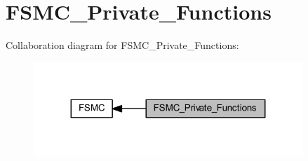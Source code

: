 \hypertarget{group___f_s_m_c___private___functions}{}\section{F\+S\+M\+C\+\_\+\+Private\+\_\+\+Functions}
\label{group___f_s_m_c___private___functions}
Collaboration diagram for F\+S\+M\+C\+\_\+\+Private\+\_\+\+Functions\+:
\nopagebreak
\begin{figure}[H]
\begin{center}
\leavevmode
\includegraphics[width=287pt]{group___f_s_m_c___private___functions}
\end{center}
\end{figure}
